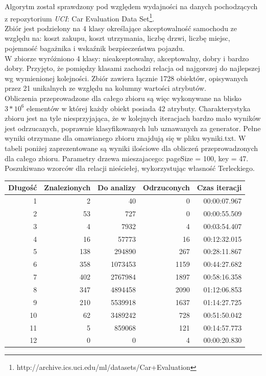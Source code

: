 \documentclass[a4paper,12pt]{article}
\begin{document}
Algorytm został sprawdzony pod względem wydajności na danych pochodzących z repozytorium \textit{UCI}: Car Evaluation Data Set\footnote{http://archive.ics.uci.edu/ml/datasets/Car+Evaluation}.\\

Zbiór jest podzielony na 4 klasy określające akceptowalność samochodu ze względu na: koszt zakupu, koszt utrzymania, liczbę drzwi, liczbę miejsc, pojemność bagażnika i wskaźnik bezpieczeństwa pojazdu.\\

W zbiorze wyróżniono 4 klasy: nieakceptowalny, akceptowalny, dobry i bardzo dobry. Przyjęto, że pomiędzy klasami zachodzi relacja od najgorszej do najlepszej wg wymienionej kolejności. Zbiór zawiera łącznie 1728 obiektów, opisywanych przez 21 unikalnych ze względu na kolumny wartości atrybutów.\\

Obliczenia przeprowadzone dla całego zbioru są więc wykonywane na blisko $3*10^6$ elementów w której każdy obiekt posiada 42 atrybuty. Charakterystyka zbioru jest na tyle niesprzyjająca, że w kolejnych iteracjach bardzo mało wyników jest odrzucanych, poprawnie klasyfikowanych lub uznawanych za generator. Pełne wyniki otrzymane dla omawianego zbioru znajdują się w pliku wyniki.txt. W tabeli poniżej zaprezentowane są wyniki ilościowe dla obliczeń przeprowadzonych dla całego zbioru. Parametry drzewa mieszajacego: pageSize = 100, key = 47. Poszukiwano wzorców dla relacji nieściełej, wykorzystując własność Terleckiego.

\vspace{0.5cm}

\begin{tabular}{|r|r|r|r|r|}
\hline
Długość & Znalezionych & Do analizy & Odrzuconych & Czas iteracji \\ \hline
1  & 2 & 40 & 0 & 00:00:07.967 \\ \hline 
2  & 53 & 727 & 0 & 00:00:55.509 \\ \hline
3  & 4 & 7932 & 4 & 00:03:54.407 \\ \hline
4  & 16 & 57773 & 16 & 00:12:32.015 \\ \hline
5  & 138 & 294890 & 267 & 00:28:11.867 \\ \hline
6  & 358 & 1073453 & 1159 & 00:44:27.682 \\ \hline
7  & 402 & 2767984 & 1897 & 00:58:16.358 \\ \hline
8  & 347 & 4894458 & 2090 & 01:12:06.853 \\ \hline
9  & 210 & 5539918 & 1637 & 01:14:27.725 \\ \hline
10 & 62 & 3489242 & 728 & 00:51:50.042 \\ \hline
11 & 5 & 859068 & 121 & 00:14:57.773 \\ \hline
12 & 0 & 0 & 4 & 00:00:20.830 \\ \hline

\end{tabular}
\end{document}

